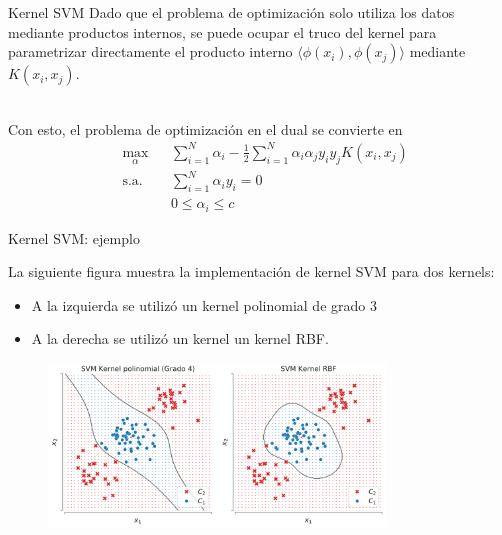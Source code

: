 \documentclass[9pt, handout]{beamer}
\begin{document}
\begin{frame}{Kernel SVM}
	Dado que el problema de optimización solo utiliza los datos mediante productos internos, se puede ocupar el truco del kernel para parametrizar directamente el producto interno $\langle \phi(x_i), \phi(x_j)\rangle$ mediante $K(x_i,x_j)$.\\~\ \pause
	
Con esto, el problema de optimización en el dual se convierte en 
\begin{equation*}
\begin{aligned}
& \underset{\alpha}{\text{max}}
& & \sum\limits_{i=1}^{N}\alpha_i - \frac{1}{2} \sum\limits_{i=1}^{N} \alpha_i \alpha_j y_i y_j K(x_i, x_j)\\
& \text{s.a.}
& & \sum\limits_{i=1}^{N} \alpha_i y_i= 0 \\
& &  &0 \leq \alpha_i \leq c
\end{aligned}
\end{equation*}

\end{frame}


\begin{frame}{Kernel SVM: ejemplo}

La siguiente figura muestra la implementación de kernel SVM para dos kernels:

\begin{itemize}
	\item A la izquierda se utilizó un kernel polinomial de grado $3$
	\item A la derecha se utilizó un kernel un kernel RBF.
\end{itemize}

\begin{figure}[h]
    \centering
    \includegraphics[width=0.8\textwidth]{../../img/cap5_svm_2kernels}
\end{figure}

\end{frame}
\end{document}
